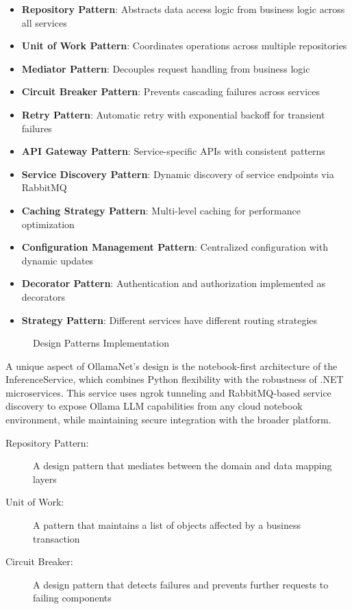 \begin{itemize}
    \item \textbf{Repository Pattern}: Abstracts data access logic from business logic across all services
    \item \textbf{Unit of Work Pattern}: Coordinates operations across multiple repositories
    \item \textbf{Mediator Pattern}: Decouples request handling from business logic
    \item \textbf{Circuit Breaker Pattern}: Prevents cascading failures across services
    \item \textbf{Retry Pattern}: Automatic retry with exponential backoff for transient failures
    \item \textbf{API Gateway Pattern}: Service-specific APIs with consistent patterns
    \item \textbf{Service Discovery Pattern}: Dynamic discovery of service endpoints via RabbitMQ
    \item \textbf{Caching Strategy Pattern}: Multi-level caching for performance optimization
    \item \textbf{Configuration Management Pattern}: Centralized configuration with dynamic updates
    \item \textbf{Decorator Pattern}: Authentication and authorization implemented as decorators
    \item \textbf{Strategy Pattern}: Different services have different routing strategies
\end{itemize}

\begin{figure}
    \centering
    \caption{Design Patterns Implementation}
    \label{fig:design-patterns}
\end{figure}

A unique aspect of OllamaNet's design is the notebook-first architecture of the InferenceService, which combines Python flexibility with the robustness of .NET microservices. This service uses ngrok tunneling and RabbitMQ-based service discovery to expose Ollama LLM capabilities from any cloud notebook environment, while maintaining secure integration with the broader platform.

\begin{terminology}
\begin{description}
    \item[Repository Pattern:] A design pattern that mediates between the domain and data mapping layers
    \item[Unit of Work:] A pattern that maintains a list of objects affected by a business transaction
    \item[Circuit Breaker:] A design pattern that detects failures and prevents further requests to failing components
\end{description}
\end{terminology}






